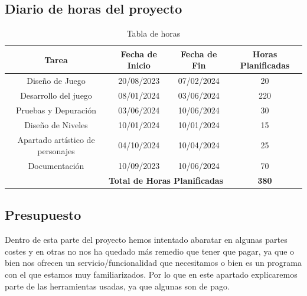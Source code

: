 \documentclass[a4paper]{article}
\begin{document}
\subsection{Diario de horas del proyecto}
\begin{table}[ht]
    \centering
    \begin{tabular}{|c|c|c|c|}
        \hline
        \textbf{Tarea}                                             & \textbf{Fecha de Inicio} & \textbf{Fecha de Fin} & \textbf{Horas Planificadas} \\
        \hline
        Diseño de Juego                                            & 20/08/2023               & 07/02/2024            & 20                          \\
        \hline
        Desarrollo del juego                                       & 08/01/2024               & 03/06/2024            & 220                         \\
        \hline
        Pruebas y Depuración                                       & 03/06/2024               & 10/06/2024            & 30                          \\
        \hline
        Diseño de Niveles                                          & 10/01/2024               & 10/01/2024            & 15                          \\
        \hline
        Apartado artístico de personajes                           & 04/10/2024               & 10/04/2024            & 25                          \\
        \hline
        Documentación                                              & 10/09/2023               & 10/06/2024            & 70                          \\
        \hline
        \multicolumn{3}{|r|}{\textbf{Total de Horas Planificadas}} & \textbf{380}                                                                   \\
        \hline
    \end{tabular}
    \caption{Tabla de horas}
    \label{tab:planificacion-horas}
\end{table}
\clearpage
\subsection{Presupuesto}

Dentro de esta parte del proyecto hemos intentado abaratar en algunas partes costes y en otras no nos ha quedado más remedio que tener que pagar, ya que o bien nos ofrecen un servicio/funcionalidad que necesitamos o bien es un programa con el que estamos muy familiarizados. Por lo que en este apartado explicaremos parte de las herramientas usadas, ya que algunas son de pago. \\
\end{document}
